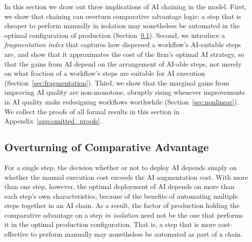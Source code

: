 In this section we draw out three implications of AI chaining in the model.
First, we show that chaining can overturn comparative advantage logic: a step that is cheaper to perform manually in isolation may nonetheless be automated in the optimal configuration of production (Section~\ref{sec:comparative_advantage}).
Second, we introduce a \emph{fragmentation index} that captures how dispersed a workflow's AI-suitable steps are, and show that it approximates the cost of the firm's optimal AI strategy, so that the gains from AI depend on the arrangement of AI-able steps, not merely on what fraction of a workflow's steps are suitable for AI execution (Section~\ref{sec:fragmentation}).
Third, we show that the marginal gains from improving AI quality are non-monotone, abruptly rising whenever improvements in AI quality make redesigning workflows worthwhile (Section~\ref{sec:nonlinear}).
We collect the proofs of all formal results in this section in Appendix~\ref{app:omitted_proofs}.

\subsection{Overturning of Comparative Advantage}
\label{sec:comparative_advantage}

For a single step, the decision whether or not to deploy AI depends simply on whether the manual execution cost exceeds the AI augmentation cost.
With more than one step, however, the optimal deployment of AI depends on more than each step's own characteristics, because of the benefits of automating multiple steps together in an AI chain.
As a result, the factor of production holding the comparative advantage on a step \emph{in isolation} need not be the one that performs it in the optimal production configuration.
That is, a step that is more cost-effective to perform manually may nonetheless be automated as part of a chain.

